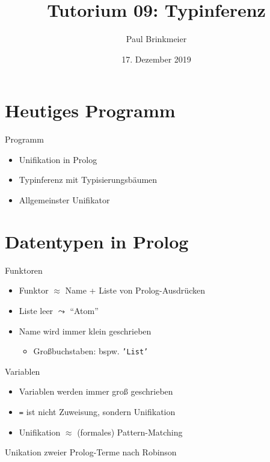 \documentclass{beamer}
\title{Tutorium 09: Typinferenz}
\author{Paul Brinkmeier}
\institute{Tutorium Programmierparadigmen am KIT}
\date{17. Dezember 2019}
\newcommand{\code}[1]{
	\begin{mdframed}
		
	\end{mdframed}
}
\begin{document}
\begin{frame}
	\titlepage
\end{frame}

\section{Heutiges Programm}

\begin{frame}{Programm}
	\begin{itemize}
		\item Unifikation in Prolog
		\item Typinferenz mit Typisierungsbäumen
		\item Allgemeinster Unifikator
	\end{itemize}
\end{frame}

\section{Datentypen in Prolog}

\begin{frame}{Funktoren}
	\code{demos/funktoren.pl}

	\begin{itemize}
		\item Funktor $\approx$ Name + Liste von Prolog-Ausdrücken
		\item Liste leer $\leadsto$ \enquote{Atom}
		\item Name wird immer klein geschrieben
		\begin{itemize}
			\item Großbuchstaben: bspw. \texttt{'List'}
		\end{itemize}
	\end{itemize}
\end{frame}

\begin{frame}{Variablen}
	\code{demos/variablen.pl}

	\begin{itemize}
		\item Variablen werden immer groß geschrieben
		\item \texttt{=} ist nicht Zuweisung, sondern Unifikation
		\item Unifikation $\approx$ (formales) Pattern-Matching
	\end{itemize}
\end{frame}

\begin{frame}{Unikation zweier Prolog-Terme nach Robinson}
	\code{code/robinson.pseudo}
\end{frame}
\end{document}
